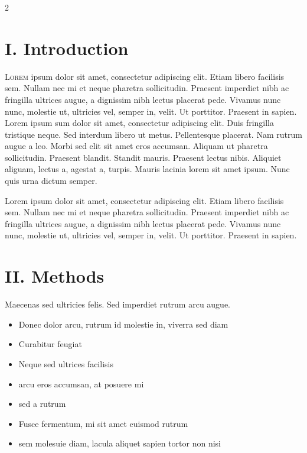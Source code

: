\documentclass[12pt]{article}
\begin{document}
\begin{multicols}{2}

\section*{I. \quad Introduction}

\lettrine[lines=3]{L}{orem} ipsum dolor sit amet, consectetur adipiscing elit. Etiam libero facilisis sem. Nullam nec mi et neque pharetra sollicitudin. Praesent imperdiet nibh ac fringilla ultrices augue, a dignissim nibh lectus placerat pede. Vivamus nunc nunc, molestie ut, ultricies vel, semper in, velit. Ut porttitor. Praesent in sapien. Lorem ipsum sum dolor sit amet, consectetur adipiscing elit. Duis fringilla tristique neque. Sed interdum libero ut metus. Pellentesque placerat. Nam rutrum augue a leo. Morbi sed elit sit amet eros accumsan. Aliquam ut pharetra sollicitudin. Praesent blandit. Standit mauris. Praesent lectus nibis. Aliquiet aliguam, lectus a, agestat a, turpis. Mauris lacinia lorem sit amet ipsum. Nunc quis urna dictum semper.

\noindent Lorem ipsum dolor sit amet, consectetur adipiscing elit. Etiam libero facilisis sem. Nullam nec mi et neque pharetra sollicitudin. Praesent imperdiet nibh ac fringilla ultrices augue, a dignissim nibh lectus placerat pede. Vivamus nunc nunc, molestie ut, ultricies vel, semper in, velit. Ut porttitor. Praesent in sapien.

\section*{II. \quad Methods}

Maecenas sed ultricies felis. Sed imperdiet rutrum arcu augue.

\begin{itemize}
\item Donec dolor arcu, rutrum id molestie in, viverra sed diam
\item Curabitur feugiat
\item Neque sed ultrices facilisis
\item arcu eros accumsan, at posuere mi
\item sed a rutrum
\item Fusce fermentum, mi sit amet euismod rutrum
\item sem molesuie diam, lacula aliquet sapien tortor non nisi
\end{itemize}


\end{multicols}
\end{document}
